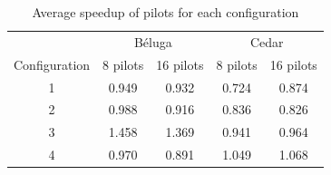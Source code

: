     \begin{table}                                                                    
	\centering                                                                       
	\begin{tabular}{c|c|c|c|c}                                                             
	    {} & \multicolumn{2}{c}{B\'eluga} & \multicolumn{2}{c}{Cedar}\\
	\rowcolor{headcolor}                                                             
	Configuration & 8 pilots & 16 pilots & 8 pilots & 16 pilots\\
	
	\hline                                                                           
	1 & 0.949 & 0.932 & 0.724 & 0.874\\
	
	2 & 0.988 & 0.916 & 0.836 & 0.826\\
	
	3 & 1.458 & 1.369 & 0.941 & 0.964\\
	4 & 0.970 & 0.891 & 1.049 & 1.068\\
	\end{tabular}                                                                    
	\setlength{\belowcaptionskip}{-10pt}                                             
	\caption{Average speedup of pilots for each configuration}                                                    
	\label{table:spa:speedup}                                                            
    \end{table} 
    
    
    
